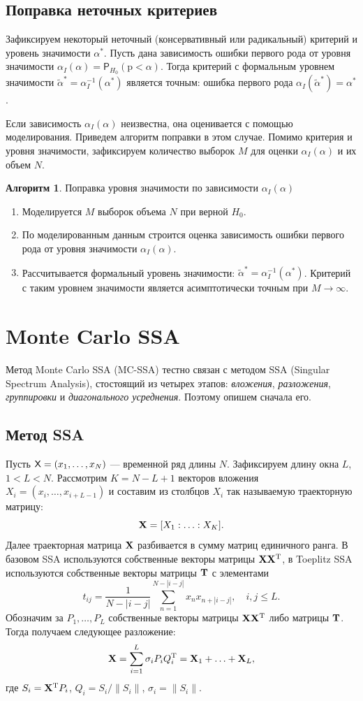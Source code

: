 \documentclass[specialist,
substylefile = spbu_report.rtx,
subf,href,colorlinks=true, 12pt]{disser}
\theoremstyle{definition}
\newtheorem{algorithm}{Алгоритм}
\begin{document}
\subsection{Поправка неточных критериев}\label{sect:correction}
Зафиксируем некоторый неточный (консервативный или радикальный) критерий и уровень значимости $\alpha^*$. Пусть дана зависимость ошибки первого рода от уровня значимости $\alpha_I(\alpha)=\mathsf P_{H_0}(\mathrm p < \alpha)$. Тогда критерий с формальным уровнем значимости $\widetilde\alpha^*=\alpha_I^{-1}(\alpha^*)$ является точным: ошибка первого рода $\alpha_I(\widetilde\alpha^*)=\alpha^*$.

Если зависимость $\alpha_I(\alpha)$ неизвестна, она оценивается с помощью моделирования. Приведем алгоритм поправки в этом случае. Помимо критерия и уровня значимости, зафиксируем количество выборок $M$ для оценки $\alpha_I(\alpha)$ и их объем $N$.
\begin{algorithm}{Поправка уровня значимости по зависимости $\alpha_I(\alpha)$}~\cite{Larin2022}\label{alg:correction}
	\begin{enumerate}
		\item Моделируется $M$ выборок объема $N$ при верной $H_0$.
		\item По моделированным данным строится оценка зависимость ошибки первого рода от уровня значимости $\alpha_I(\alpha)$.
		\item Рассчитывается формальный уровень значимости: $\widetilde{\alpha}^*=\alpha_I^{-1}(\alpha^*)$. Критерий с таким уровнем значимости является асимптотически точным при $M\to\infty$.
	\end{enumerate}
\end{algorithm}

\section{Monte Carlo SSA}
Метод Monte Carlo SSA (MC-SSA) тестно связан с методом SSA (Singular Spectrum Analysis), стостоящий из четырех этапов: \emph{вложения}, \emph{разложения}, \emph{группировки} и \emph{диагонального усреднения}. Поэтому опишем сначала его.
\subsection{Метод SSA}
Пусть $\mathsf{X}=(x_1,\ldots,x_N)$ --- временной ряд длины $N$. Зафиксируем длину окна $L$, $1<L<N$. Рассмотрим $K=N-L+1$ векторов вложения $X_i=(x_i,\ldots,x_{i+L-1})$ и составим из столбцов $X_i$ так называемую траекторную матрицу:
\[
	\mathbf{X} = [X_1:\ldots:X_K].
\]
Далее траекторная матрица $\mathbf{X}$ разбивается в сумму матриц единичного ранга. В базовом SSA используются собственные векторы матрицы $\mathbf{X}\mathbf{X}^{\mathrm{T}}$, в Toeplitz SSA используются собственные векторы матрицы $\mathbf{T}$ с элементами
\begin{equation}\label{eq:toeplitz}
	t_{ij} = \frac{1}{N - |i - j|}\sum_{n=1}^{N - |i - j|}x_n x_{n+|i-j|},\quad i,j\leqslant L.
\end{equation}
Обозначим за $P_1,\ldots,P_L$ собственные векторы матрицы $\mathbf{X}\mathbf{X}^{\mathrm{T}}$ либо матрицы $\mathbf{T}$. Тогда получаем следующее разложение:
\[
	\mathbf{X} = \sum_{i=1}^L \sigma_i P_i Q_i^{\mathrm{T}} = \mathbf{X}_1+\ldots+\mathbf{X}_L,
\]
где $S_i=\mathbf{X}^{\mathrm{T}} P_i$, $Q_i=S_i/\|S_i\|$, $\sigma_i=\|S_i\|$.
\end{document}
